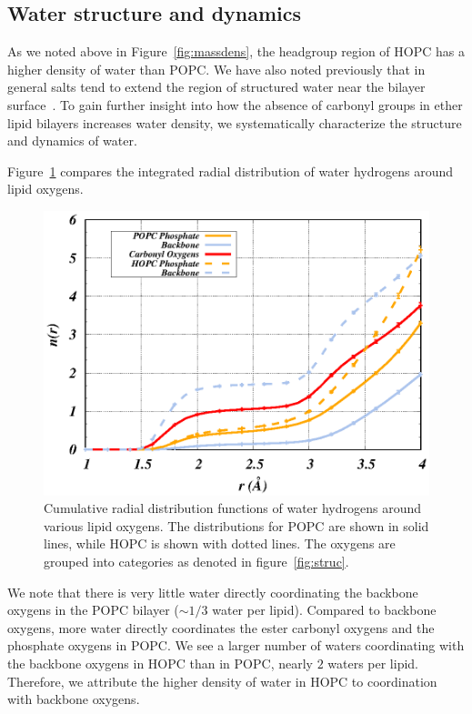 \documentclass[12pt,openany,final]{book}
\newcommand{\about}{$\sim$}
\begin{document}
\subsection{Water structure and dynamics}
\label{sec:waterstruc}
As we noted above in Figure~\ref{fig:massdens}, the headgroup region of HOPC has a higher density of water than 
POPC. We have also noted previously that in 
general salts tend to extend the region of structured water near the bilayer surface~\cite{kruczek:2017}. 
To gain further insight into how the absence of carbonyl groups in ether lipid bilayers increases water density, we systematically characterize the structure and dynamics of water.  

Figure~\ref{fig:hrdf} compares the integrated radial distribution of water hydrogens around lipid oxygens. 
\begin{figure}[p]
\caption[Cumulative radial distribution functions of water hydrogens around
various lipid oxygens.]{ 
Cumulative radial distribution functions of water hydrogens around
various lipid oxygens. The distributions for POPC are shown in solid lines, while HOPC is shown with dotted lines. 
The oxygens are grouped into categories as denoted in figure~\ref{fig:struc}.}
\label{fig:hrdf}
\includegraphics[width=\textwidth]{h_rdf_cum.eps}
\end{figure}
We note that there is very little water directly coordinating the backbone oxygens in the POPC bilayer (\about $1/3$ water per lipid). 
Compared to backbone oxygens, more water directly coordinates the ester carbonyl oxygens and the phosphate oxygens in POPC. 
We see a larger number of waters coordinating with the backbone oxygens in HOPC than in POPC, nearly $2$ waters per lipid.
Therefore, we attribute the higher density of water in HOPC to coordination with backbone oxygens. 
\end{document}
